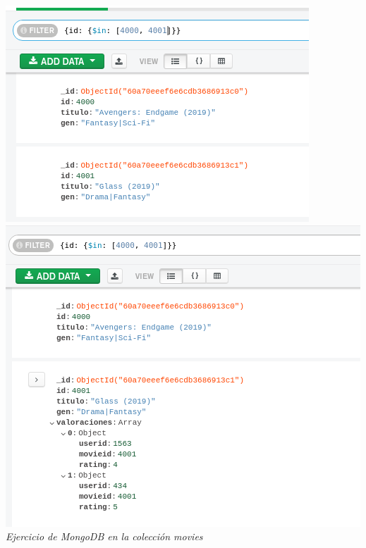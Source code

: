 \documentclass[10pt]{article}
\begin{document}
\begin{center}
  \includegraphics[scale=0.25]{imgs/20.png}\\
  \includegraphics[scale=0.25]{imgs/21.png}\\
  \textit{Ejercicio de MongoDB en la colección movies}
\end{center}
\end{document}
